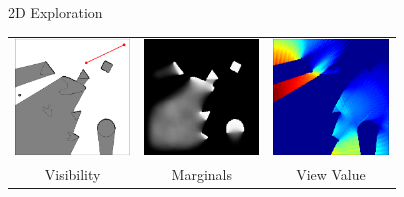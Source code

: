 \addtocounter{framenumber}{-1}
\begin{tframe}{2D Exploration}
\begin{center}

\bigskip
\begin{tabular}{ccc}
\includegraphics[width=1.2in]{media_exploration/2D_scene_02}&
\includegraphics[width=1.2in]{media_exploration/2D_marginal_02}&
\includegraphics[width=1.2in]{media_exploration/2D_energy_02}
\\ Visibility & Marginals & View Value
\end{tabular}
\end{center}
\end{tframe}

